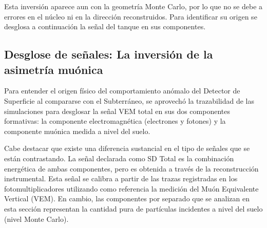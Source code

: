 {\color{blue}Esta inversión aparece aun con la geometría Monte Carlo, por lo que no se debe a errores en el núcleo ni en la dirección reconstruidos. Para identificar su origen se desglosa a continuación la señal del tanque en sus componentes.}

\subsection{Desglose de señales: La inversión de la asimetría muónica}
\label{subsubsec:desglose_sd}

Para entender el origen físico del comportamiento anómalo del Detector de Superficie al compararse con el Subterráneo, se aprovechó la trazabilidad de las simulaciones para desglosar la señal VEM total en sus dos componentes formativas: la componente electromagnética (electrones y fotones) y la componente muónica medida a nivel del suelo. 

Cabe destacar que existe una diferencia sustancial en el tipo de señales que se están contrastando. La señal declarada como SD Total es la combinación energética de ambas componentes, pero es obtenida a través de la reconstrucción instrumental. Esta señal se calibra a partir de las trazas registradas en los fotomultiplicadores utilizando como referencia la medición del Muón Equivalente Vertical (VEM). En cambio, las componentes por separado que se analizan en esta sección representan la cantidad pura de partículas incidentes a nivel del suelo (nivel Monte Carlo). 

